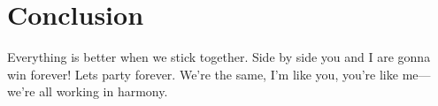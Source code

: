 \chapter{Conclusion}
\label{toc:conclusion}
Everything is better when we stick together.
Side by side you and I are gonna win forever!
Lets party forever.
We're the same, I'm like you, you're like me---we're all working in harmony.
